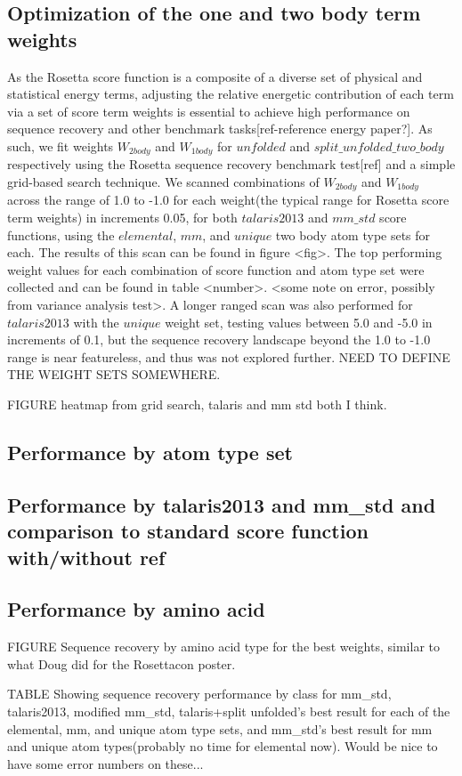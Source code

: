 \subsection{Optimization of the one and two body term weights}
As the Rosetta score function is a composite of a diverse set of physical and statistical energy terms, adjusting the relative energetic contribution of each term via a set of score term weights is essential to achieve high performance on sequence recovery and other benchmark tasks[ref-reference energy paper?]. As such, we fit weights $W_{2body}$ and $W_{1body}$ for $unfolded$ and $split\_unfolded\_two\_body$ respectively using the Rosetta sequence recovery benchmark test[ref] and a simple grid-based search technique. We scanned combinations of $W_{2body}$ and $W_{1body}$ across the range of 1.0 to -1.0 for each weight(the typical range for Rosetta score term weights) in increments 0.05, for both $talaris2013$ and $mm\_std$ score functions, using the $elemental$, $mm$, and $unique$ two body atom type sets for each. The results of this scan can be found in figure <fig>. The top performing weight values for each combination of score function and atom type set were collected and can be found in table <number>. <some note on error, possibly from variance analysis test>. A longer ranged scan was also performed for $talaris2013$ with the $unique$ weight set, testing values between 5.0 and -5.0 in increments of 0.1, but the sequence recovery landscape beyond the 1.0 to -1.0 range is near featureless, and thus was not explored further. NEED TO DEFINE THE WEIGHT SETS SOMEWHERE.

FIGURE heatmap from grid search, talaris and mm std both I think.

\subsection{Performance by atom type set}

\subsection{Performance by talaris2013 and mm\_std and comparison to standard score function with/without ref}

\subsection{Performance by amino acid}

FIGURE Sequence recovery by amino acid type for the best weights, similar to what Doug did for the Rosettacon poster.

TABLE Showing sequence recovery performance by class for mm\_std, talaris2013, modified mm\_std, talaris+split unfolded's best result for each of the elemental, mm, and unique atom type sets, and mm\_std's best result for mm and unique atom types(probably no time for elemental now). Would be nice to have some error numbers on these...
